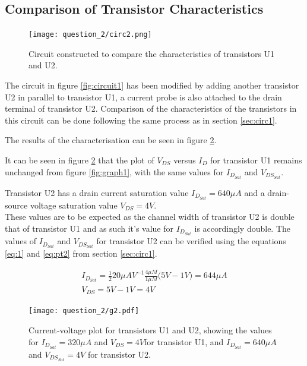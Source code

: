 \documentclass[11pt, a4paper]{article}
\begin{document}
\newpage
\subsection{Comparison of Transistor Characteristics}

\begin{figure}
  \centering
    \caption{Circuit constructed to compare the characteristics of transistors U1 and U2.}
    \texttt{[image: question\_2/circ2.png]}
    \label{fig:circuit2}
\end{figure}


The circuit in figure \ref{fig:circuit1} has been modified by adding another transistor U2 in parallel to transistor U1, a current probe is also attached to the drain terminal of transistor U2. Comparison of the characteristics of the transistors in this circuit can be done following the same process as in section \ref{sec:circ1}. 

The results of the characterisation can be seen in figure \ref{fig:graph2}.

It can be seen in figure \ref{fig:graph2} that the plot of $V_{DS}$ versus $I_D$ for transistor U1 remains unchanged from figure \ref{fig:graph1}, with the same values for $I_{D_{Sat}}$ and $V_{DS_{Sat}}$.

Transistor U2 has a drain current saturation value $I_{D_{Sat}} = 640 \mu A$ and a drain-source voltage saturation value $V_{DS} = 4V$.\\ These values are to be expected as the channel width of transistor U2 is double that of transistor U1 and as such it's value for $I_{D_{Sat}}$ is accordingly double. The values of $I_{D_{Sat}}$ and $V_{DS_{Sat}}$ for transistor U2 can be verified using the equations \ref{eq:1} and \ref{eq:pt2} from section \ref{sec:circ1}.

\begin{gather}
    I_{D_{Sat}} = \frac{1}{2}20 \mu AV^{-1}\frac{4\mu M}{1 \mu M}\bigg(5V - 1V\bigg) = 644 \mu A \\
    V_{DS} = 5V - 1V = 4V 
\end{gather}

\begin{figure}
  \centering
  \texttt{[image: question\_2/g2.pdf]}
  \caption{\centering Current-voltage plot for transistors U1 and U2, showing the values for $I_{D_{Sat}} = 320 \mu A$ and $V_{DS} = 4V$for transistor U1, and $I_{D_{Sat}} = 640 \mu A$ and $V_{DS_{Sat}} = 4V$ for transistor U2.}
    \label{fig:graph2}
\end{figure}
\end{document}
